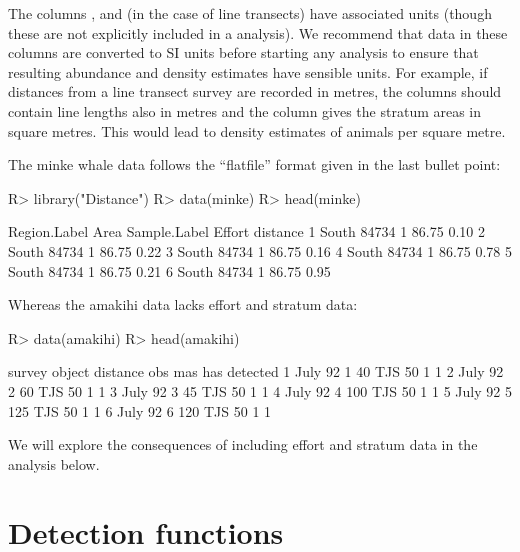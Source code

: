 \documentclass[article,shortnames]{jss}
\begin{document}
The columns ,  and (in the case of line
transects)  have associated units (though these are not
explicitly included in a  analysis). We recommend that
data in these columns are converted to SI units before starting any
analysis to ensure that resulting abundance and density estimates have
sensible units. For example, if distances from a line transect survey
are recorded in metres, the  columns should contain line
lengths also in metres and the  column gives the stratum
areas in square metres. This would lead to density estimates of animals
per square metre.

The minke whale data follows the ``flatfile'' format given in the last
bullet point:

\begin{CodeChunk}
\begin{CodeInput}
R> library("Distance")
R> data(minke)
R> head(minke)
\end{CodeInput}
\begin{CodeOutput}
  Region.Label  Area Sample.Label Effort distance
1        South 84734            1  86.75     0.10
2        South 84734            1  86.75     0.22
3        South 84734            1  86.75     0.16
4        South 84734            1  86.75     0.78
5        South 84734            1  86.75     0.21
6        South 84734            1  86.75     0.95
\end{CodeOutput}
\end{CodeChunk}

Whereas the amakihi data lacks effort and stratum data:

\begin{CodeChunk}
\begin{CodeInput}
R> data(amakihi)
R> head(amakihi)
\end{CodeInput}
\begin{CodeOutput}
   survey object distance obs mas has detected
1 July 92      1       40 TJS  50   1        1
2 July 92      2       60 TJS  50   1        1
3 July 92      3       45 TJS  50   1        1
4 July 92      4      100 TJS  50   1        1
5 July 92      5      125 TJS  50   1        1
6 July 92      6      120 TJS  50   1        1
\end{CodeOutput}
\end{CodeChunk}

We will explore the consequences of including effort and stratum data in
the analysis below.

\section{Detection functions}\label{detection-functions}
\end{document}
